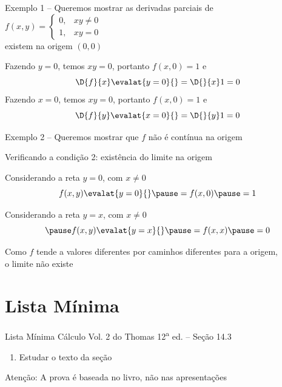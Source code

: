 \begin{frame}{Exemplo \theexemplo}
  1 -- Queremos mostrar as derivadas parciais de
  \(
  f(x, y) = \begin{cases}
    0, & xy \neq 0 \\
    1, & xy = 0
  \end{cases}
  \)\\
  existem na origem $(0, 0)$

  \pause
  Fazendo $y=0$,
  \pause
  temos $xy=0$,
  \pause
  portanto \(f(x, 0) = 1\)
  \pause
  e
  \[
    \D{f}{x}\evalat{y=0}{} = \D{}{x} 1  = 0
  \]
  \pause
  Fazendo $x=0$,
  \pause
  temos $xy=0$,
  \pause
  portanto \(f(x, 0) = 1\)
  \pause
  e
  \[
    \D{f}{y}\evalat{x=0}{} = \D{}{y} 1  = 0
  \]

\end{frame}

\begin{frame}{Exemplo \theexemplo}
  2 -- Queremos mostrar que $f$ não é contínua na origem

  \pause
  Verificando a condição 2: existência do limite na origem

  \pause
  Considerando a reta $y=0$, com $x\neq 0$
  \pause
  \[
    f(x, y)\evalat{y=0}{}
    \pause
    = f(x, 0)
    \pause
    = 1
  \]

  \pause
  Considerando a reta $y=x$, com $x\neq 0$
  \[
    \pause
    f(x, y)\evalat{y=x}{}
    \pause
    = f(x, x)
    \pause
    = 0
  \]

  \pause
  Como $f$ tende a valores diferentes por
  caminhos diferentes para a origem,\\
  o limite não existe
\end{frame}


\section{Lista Mínima}

\begin{frame}{Lista Mínima}
  Cálculo Vol. 2 do Thomas 12\textsuperscript{a} ed. -- Seção 14.3
  \begin{enumerate}
    \item Estudar o texto da seção
  \end{enumerate}

  \vfill
  Atenção: A prova é baseada no livro, não nas apresentações
\end{frame}


